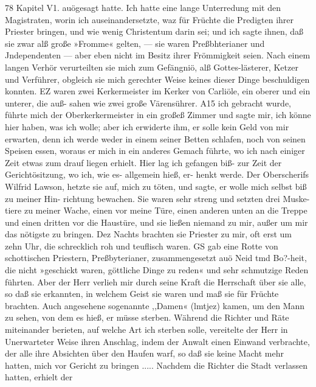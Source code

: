 78 Kapitel V1.
auögesagt hatte. Ich hatte eine lange Unterredung mit den
Magistraten, worin ich auseinandersetzte, waz für Früchte die
Predigten ihrer Priester bringen, und wie wenig Christentum darin
sei; und ich sagte ihnen, daß sie zwar alß große »Fromme«
gelten, — sie waren Preßbhterianer und Jndependenten — aber
eben nicht im Besitz ihrer Frömmigkeit seien. Nach einem langen
Verhör verurteilten sie mich zum Gefängniö, alß Gottes-lästerer,
Ketzer und Verführer, obgleich sie mich gerechter Weise keines
dieser Dinge beschuldigen konnten. EZ waren zwei Kerkermeister
im Kerker von Carliöle, ein oberer und ein unterer, die auß-
sahen wie zwei große Värensührer. A15 ich gebracht wurde,
führte mich der Oberkerkermeister in ein großeß Zimmer und sagte
mir, ich könne hier haben, was ich wolle; aber ich erwiderte
ihm, er solle kein Geld von mir erwarten, denn ich werde weder
in einem seiner Betten schlafen, noch von seinen Speisen essen,
woraus er mich in ein anderes Gemach führte, wo ich nach einiger
Zeit etwas zum drauf liegen erhielt. Hier lag ich gefangen biß-
zur Zeit der Gerichtösitzung, wo ich, wie es- allgemein hieß, er-
henkt werde. Der Oberscherifs Wilfrid Lawson, hetzte sie auf,
mich zu töten, und sagte, er wolle mich selbst biß zu meiner Hin-
richtung bewachen. Sie waren sehr streng und setzten drei Muske-
tiere zu meiner Wache, einen vor meine Türe, einen anderen
unten an die Treppe und einen dritten vor die Haustüre, und
sie ließen niemand zu mir, außer um mir das nötigste zu bringen.
Dez Nachts brachten sie Priester zu mir, oft erst um zehn Uhr,
die schrecklich roh und teuflisch waren. GS gab eine Rotte von
schottischen Priestern, Preßbyterianer, zusammengesetzt auö Neid
tmd Bo?-heit, die nicht »geschickt waren, göttliche Dinge zu reden«
und sehr schmutzige Reden führten. Aber der Herr verlieh mir
durch seine Kraft die Herrschaft über sie alle, so daß sie erkannten,
in welchem Geist sie waren und maß sie für Früchte brachten.
Auch angesehene sogenannte ,,Damen« (lmtjez) kamen, um den
Mann zu sehen, von dem es hieß, er müsse sterben. Während
die Richter und Räte miteinander berieten, auf welche Art ich
sterben solle, vereitelte der Herr in Unerwarteter Weise ihren
Anschlag, indem der Anwalt einen Einwand verbrachte, der
alle ihre Absichten über den Haufen warf, so daß sie keine
Macht mehr hatten, mich vor Gericht zu bringen .....
Nachdem die Richter die Stadt verlassen hatten, erhielt der


